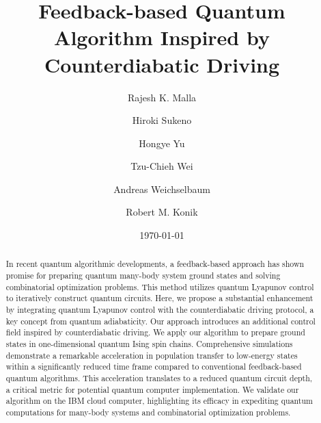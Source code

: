 \documentclass[twocolumn,aps,superscriptaddress,floatfix,longbibliography]{revtex4-2}
\begin{document}
	
	 \title{Feedback-based Quantum Algorithm Inspired by Counterdiabatic Driving}
	
\author{Rajesh K. Malla}

\author{Hiroki Sukeno}

\author{Hongye Yu}

\author{Tzu-Chieh Wei}

\author{Andreas Weichselbaum}

\author{Robert M. Konik}
	
\date{\today}
	
\begin{abstract}
In recent quantum algorithmic developments, a feedback-based
approach has shown promise for preparing quantum many-body
system ground states and solving combinatorial optimization
problems. This method utilizes quantum Lyapunov control to
iteratively construct quantum circuits. Here, we propose a
substantial enhancement by integrating quantum Lyapunov control
with the counterdiabatic driving protocol, a key concept from
quantum adiabaticity. Our approach introduces an additional
control field inspired by counterdiabatic driving. We apply our
algorithm to prepare ground states in one-dimensional quantum
Ising spin chains. Comprehensive simulations demonstrate a
remarkable acceleration in population transfer to low-energy
states within a significantly reduced time frame compared to
conventional feedback-based quantum algorithms. This
acceleration translates to a reduced quantum circuit depth, a
critical metric for potential quantum computer implementation.
We validate our algorithm on the IBM cloud computer,
highlighting its efficacy in expediting quantum computations for
many-body systems and combinatorial optimization problems.
\end{abstract}
\end{document}
